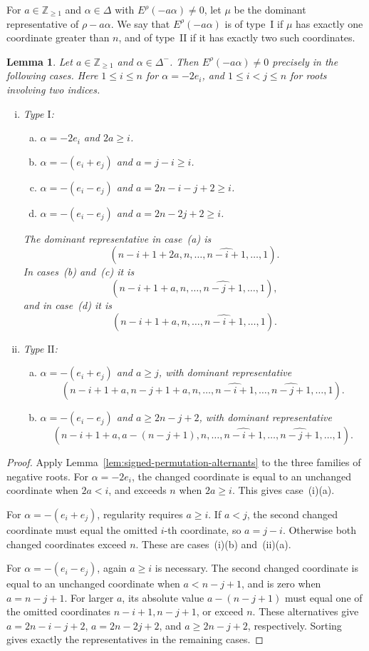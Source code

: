 \documentclass[11pt,a4paper]{amsart}
\newcommand{\ZZ}{\mathbb Z}
\theoremstyle{plain}
\newtheorem{lem}[theorem]{Lemma}
\numberwithin{equation}{section}
\def\geq{\geqslant}
\newenvironment{pf}{\begin{proof}}{\end{proof}}
\begin{document}
For \(a\in\ZZ_{\ge1}\) and \(\alpha\in\Delta\) with
\(E^\rho(-a\alpha)\ne0\), let \(\mu\) be the dominant representative
of \(\rho-a\alpha\).
We say that \(E^\rho(-a\alpha)\) is of type~\(\mathrm I\)
if \(\mu\) has exactly one coordinate greater than \(n\),
and of type~\(\mathrm{II}\) if it has exactly two such coordinates.
\begin{lem}\label{nonzero E criteria for C complex}
Let \(a\in\ZZ_{\ge1}\) and \(\alpha\in\Delta^-\).
Then \(E^\rho(-a\alpha)\ne0\) precisely in the following cases.
Here \(1\le i\le n\) for \(\alpha=-2e_i\), and
\(1\le i<j\le n\) for roots involving two indices.
\begin{enumerate}[(i)]
	\item Type $\mathrm{I}$:
	\begin{enumerate}[(a)]
\item \(\alpha=-2e_i\) and \(2a\ge i\).
\item \(\alpha=-(e_i+e_j)\) and \(a=j-i\ge i\).
\item \(\alpha=-(e_i-e_j)\) and \(a=2n-i-j+2\ge i\).
\item \(\alpha=-(e_i-e_j)\) and \(a=2n-2j+2\ge i\).
\end{enumerate}
The dominant representative in case~(a) is
\[
(n-i+1+2a,n,\dots,\widehat{n-i+1},\dots,1).
\]
In cases~(b) and~(c) it is
\[
(n-i+1+a,n,\dots,\widehat{n-j+1},\dots,1),
\]
and in case~(d) it is
\[
(n-i+1+a,n,\dots,\widehat{n-i+1},\dots,1).
\]

	\item Type $\mathrm{II}$:
	\begin{enumerate}[(a)]
		\item $\alpha=-(e_i+e_j)$ and $a\geq j$, with dominant representative
		\[
		(n-i+1+a,n-j+1+a,n,\dots,\widehat{n-i+1},\dots,\widehat{n-j+1},\dots,1).
		\]
		\item $\alpha=-(e_i-e_j)$ and $a\geq 2n-j+2$, with dominant representative
		\[
		(n-i+1+a,a-(n-j+1),n,\dots,\widehat{n-i+1},\dots,\widehat{n-j+1},\dots,1).
		\]
	\end{enumerate}
\end{enumerate}

\end{lem}
\begin{pf}
Apply Lemma~\ref{lem:signed-permutation-alternants} to the three
families of negative roots. For \(\alpha=-2e_i\), the changed coordinate
is equal to an unchanged coordinate when \(2a<i\), and exceeds
\(n\) when \(2a\ge i\). This gives case~(i)(a).

For \(\alpha=-(e_i+e_j)\), regularity requires \(a\ge i\).
If \(a<j\), the second changed coordinate must equal the omitted
\(i\)-th coordinate, so \(a=j-i\). Otherwise both changed
coordinates exceed \(n\). These are cases~(i)(b) and~(ii)(a).

For \(\alpha=-(e_i-e_j)\), again \(a\ge i\) is necessary.
The second changed coordinate is equal to an unchanged coordinate
when \(a<n-j+1\), and is zero when \(a=n-j+1\).
For larger \(a\), its absolute value \(a-(n-j+1)\) must equal one
of the omitted coordinates \(n-i+1,n-j+1\), or exceed \(n\).
These alternatives give \(a=2n-i-j+2\), \(a=2n-2j+2\), and
\(a\ge2n-j+2\), respectively. Sorting gives exactly the
representatives in the remaining cases.
\end{pf}
\end{document}

